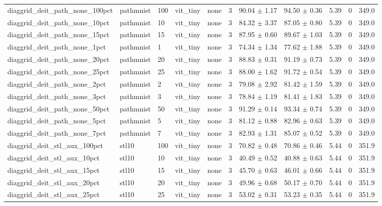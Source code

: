 \begin{tabular}{lllllllllll}
diaggrid_deit_path_none_100pct & pathmnist & 100 & vit_tiny & none & 3 & 90.04 $\pm$ 1.17 & 94.50 $\pm$ 0.36 & 5.39 & 0 & 349.0 \\
diaggrid_deit_path_none_10pct & pathmnist & 10 & vit_tiny & none & 3 & 84.32 $\pm$ 3.37 & 87.05 $\pm$ 0.80 & 5.39 & 0 & 349.0 \\
diaggrid_deit_path_none_15pct & pathmnist & 15 & vit_tiny & none & 3 & 87.95 $\pm$ 0.60 & 89.67 $\pm$ 1.03 & 5.39 & 0 & 349.0 \\
diaggrid_deit_path_none_1pct & pathmnist & 1 & vit_tiny & none & 3 & 74.34 $\pm$ 1.34 & 77.62 $\pm$ 1.88 & 5.39 & 0 & 349.0 \\
diaggrid_deit_path_none_20pct & pathmnist & 20 & vit_tiny & none & 3 & 88.83 $\pm$ 0.31 & 91.19 $\pm$ 0.73 & 5.39 & 0 & 349.0 \\
diaggrid_deit_path_none_25pct & pathmnist & 25 & vit_tiny & none & 3 & 88.00 $\pm$ 1.62 & 91.72 $\pm$ 0.54 & 5.39 & 0 & 349.0 \\
diaggrid_deit_path_none_2pct & pathmnist & 2 & vit_tiny & none & 3 & 79.08 $\pm$ 2.92 & 81.42 $\pm$ 1.59 & 5.39 & 0 & 349.0 \\
diaggrid_deit_path_none_3pct & pathmnist & 3 & vit_tiny & none & 3 & 78.84 $\pm$ 1.19 & 81.41 $\pm$ 1.83 & 5.39 & 0 & 349.0 \\
diaggrid_deit_path_none_50pct & pathmnist & 50 & vit_tiny & none & 3 & 91.29 $\pm$ 0.14 & 93.34 $\pm$ 0.74 & 5.39 & 0 & 349.0 \\
diaggrid_deit_path_none_5pct & pathmnist & 5 & vit_tiny & none & 3 & 81.12 $\pm$ 0.88 & 82.96 $\pm$ 0.63 & 5.39 & 0 & 349.0 \\
diaggrid_deit_path_none_7pct & pathmnist & 7 & vit_tiny & none & 3 & 82.93 $\pm$ 1.31 & 85.07 $\pm$ 0.52 & 5.39 & 0 & 349.0 \\
diaggrid_deit_stl_aux_100pct & stl10 & 100 & vit_tiny & none & 3 & 70.82 $\pm$ 0.48 & 70.86 $\pm$ 0.46 & 5.44 & 0 & 351.9 \\
diaggrid_deit_stl_aux_10pct & stl10 & 10 & vit_tiny & none & 3 & 40.49 $\pm$ 0.52 & 40.88 $\pm$ 0.63 & 5.44 & 0 & 351.9 \\
diaggrid_deit_stl_aux_15pct & stl10 & 15 & vit_tiny & none & 3 & 45.70 $\pm$ 0.63 & 46.01 $\pm$ 0.66 & 5.44 & 0 & 351.9 \\
diaggrid_deit_stl_aux_20pct & stl10 & 20 & vit_tiny & none & 3 & 49.96 $\pm$ 0.68 & 50.17 $\pm$ 0.70 & 5.44 & 0 & 351.9 \\
diaggrid_deit_stl_aux_25pct & stl10 & 25 & vit_tiny & none & 3 & 53.02 $\pm$ 0.31 & 53.23 $\pm$ 0.35 & 5.44 & 0 & 351.9 \\

\end{tabular}
